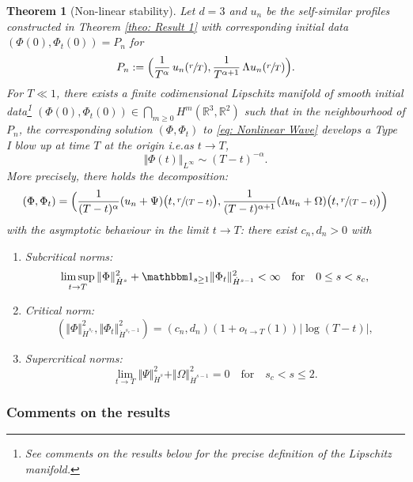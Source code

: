 \documentclass[10pt]{article}
\newcommand{\ie}{i.e.}
\let\Subsubsection\subsubsection
\newcommand{\spfrac}[2]{\sfrac{#1}{(#2)}}
\theoremstyle{plain}
\newtheorem{theorem}{Theorem}
\theoremstyle{definition}
\begin{document}
\begin{theorem}[Non-linear stability]
\label{theo: Result 2}
Let $d=3$ and $u_n$ be the self-similar profiles constructed in Theorem \ref{theo: Result 1} with corresponding initial data $(\Phi(0),\Phi_t(0))=P_n$ for
\begin{equation}
\label{eq: Profile}
P_n:=\Bigl(\frac{1}{T^\alpha}\, u_n(\sfrac{r}{T}),\frac{1}{T^{\alpha+1}}\,\Lambda u_n(\sfrac{r}{T})\Bigr).
\end{equation}
For $T\ll 1$, there exists a finite codimensional Lipschitz manifold of smooth initial data\footnote{See comments on the results below for the precise definition of the Lipschitz manifold.} $(\Phi(0),\Phi_t(0))\in\bigcap_{m\ge0} H^m(\mathbb R^3,\mathbb R^2)$ such that in the neighbourhood of $P_n$, the corresponding solution $(\Phi,\Phi_t)$ to \eqref{eq: Nonlinear Wave} develops a Type I blow up at time $T$ at the origin \ie as $t\to T$,
\[
\Vert \Phi(t)\Vert_{L^\infty}\sim(T-t)^{-\alpha}.
\]
More precisely, there holds the decomposition:
\[
(\Phi,\Phi_t) = \Bigl(\frac{1}{(T-t)^\alpha} (u_n+\Psi)\bigl(t,\spfrac{r}{T-t}\bigr),\frac{1}{(T-t)^{\alpha+1}} (\Lambda u_n+\Omega)\bigl(t,\spfrac{r}{T-t}\bigr)\Bigr)
\]
with the asymptotic behaviour in the limit $t\to T$: there exist $c_n,d_n>0$ with
\begin{enumerate}
\item
\emph{Subcritical norms:}
\begin{equation}
\label{eq: Subcritical Sobolev}
\limsup_{t\to T} \Vert \Phi\Vert_{\dot H^s}^2+\mathbbm 1_{s\ge1}\Vert \Phi_t\Vert_{\dot H^{s-1}}^2<\infty\quad \text{for}\quad 0\le s<s_c,
\end{equation}
\item
\emph{Critical norm:}
\begin{equation}
\label{eq: Critical Sobolev}
(\Vert \Phi\Vert_{\dot H^{s_c}}^2, \Vert \Phi_t\Vert_{\dot H^{s_c-1}}^2)=(c_n,d_n)(1+o_{t\to T}(1))|{\log(T-t)}|,
\end{equation}

\item
\emph{Supercritical norms:}
\begin{equation}
\label{eq: Supercritical Sobolev}
\lim_{t\to T}\Vert \Psi\Vert_{\dot H^s}^2+\Vert \Omega\Vert_{\dot H^{s-1}}^2=0 \quad\text{for}\quad s_c<s\le 2.
\end{equation}
\end{enumerate}
\end{theorem}

\Subsubsection*{Comments on the results}
\end{document}
